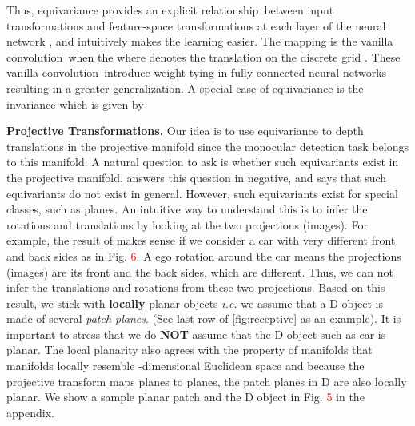 \documentclass[runningheads]{llncs}
\newcommand{\threeD}{D}
\newcommand{\equivariant} {equivariant}
\newcommand{\equivariance}{equivariance}
\newcommand{\manifold}{manifold}
\newcommand{\vanillaConv}{vanilla convolution}
\newcommand{\thatIs}{\textit{i.e.}}
\newcommand{\noIndentHeading}[1]{\noindent\textbf{#1}}
\newcommand{\refSupFigure}[1]{Fig. \textcolor{red}{#1}}
\begin{document}
        Thus, \equivariance{} provides an explicit relationship~between input transformations and feature-space transformations at each layer of the neural network \cite{worrall2018cubenet}, and intuitively makes the learning easier. 
        The mapping  is the \vanillaConv~when the  where  denotes the translation  on the discrete grid \cite{bronstein2021convolution, bronstein2021geometric, rath2020boosting}.
        These \vanillaConv~introduce weight-tying \cite{lecun1998gradient} in fully connected neural networks resulting in a greater generalization.
        A special case of \equivariance{} is the invariance \cite{worrall2018cubenet} which is given by 

\noIndentHeading{Projective Transformations.} 
        Our idea is to use \equivariance{} to depth translations in the projective \manifold{} since the monocular detection task belongs to this manifold.
        A natural question to ask is whether such \equivariant{}s exist in the projective manifold.
        \cite{burns1992non} answers this question in negative, and says that such \equivariant{}s do not exist in general. 
        However, such equivariants exist for special classes, such as planes.
        An intuitive way to understand this is  to infer the rotations and translations by looking at the two projections (images). 
        For example, the result of \cite{burns1992non} makes sense if we consider a car with very different front and back sides as in
        \refSupFigure{6}.
A  ego rotation around the car means the projections (images) are its front and the back sides, which are different. 
        Thus, we can not infer the translations and rotations 
        from these two projections.
        Based on this result, we stick with \textbf{locally} planar objects \thatIs{} we assume that a \threeD{} object is made of several \textit{patch planes}. 
        (See last row of \cref{fig:receptive} as an example). 
        It is important to stress that we do \textbf{NOT} assume that the \threeD{} object such as car is planar. 
        The local planarity also agrees with the property of manifolds that manifolds locally resemble -dimensional Euclidean space and because the projective transform maps planes to planes, the patch planes in \threeD{} are also locally planar. 
        We show a sample planar patch and the \threeD{} object in \refSupFigure{5} in the appendix.
\end{document}
